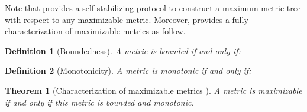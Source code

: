 \documentclass[11pt]{article}
\newtheorem{theo}{Theorem}
\newtheorem{defi}{Definition}
\newenvironment{theorem}[1]{\vspace{-0.25cm}\begin{theo}#1}{\end{theo}\vspace{-0.3cm}}
\newenvironment{definition}[1]{\vspace{-0.25cm}\begin{defi}#1}{\end{defi}\vspace{-0.3cm}}
\begin{document}
Note that \cite{GS99c} provides a self-stabilizing protocol to construct a maximum metric tree with respect to any maximizable metric. Moreover, \cite{GS03j} provides a fully characterization of maximizable metrics as follow.

\begin{definition}[Boundedness]
A metric  is \emph{bounded} if and only if: 
\end{definition}

\begin{definition}[Monotonicity]
A metric  is \emph{monotonic} if and only if:  
\end{definition}

\begin{theorem}[Characterization of maximizable metrics \cite{GS03j}]
A metric is maximizable if and only if this metric is bounded and monotonic.
\end{theorem}
\end{document}
